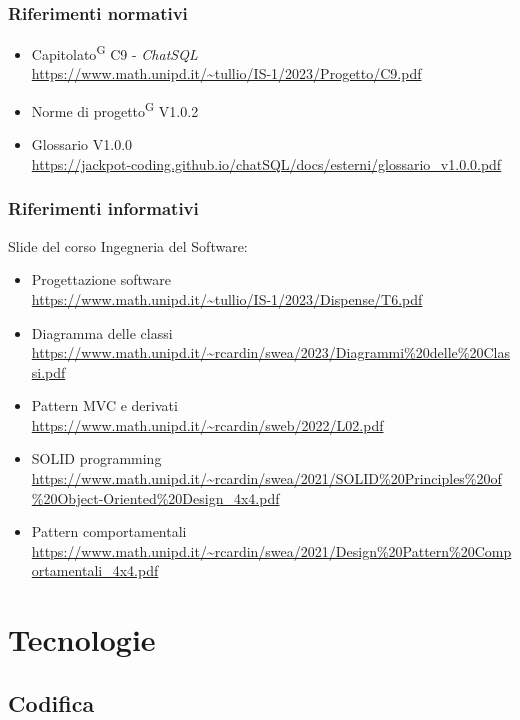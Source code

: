 \documentclass[5pt]{article}
\begin{document}
	\subsubsection{Riferimenti normativi}
	\begin{itemize}
		\item Capitolato\textsuperscript{G} C9 - \textit{ChatSQL} \\ \url{https://www.math.unipd.it/~tullio/IS-1/2023/Progetto/C9.pdf}
		\item Norme di progetto\textsuperscript{G} V1.0.2
		\item Glossario V1.0.0 \\
		\url{https://jackpot-coding.github.io/chatSQL/docs/esterni/glossario_v1.0.0.pdf}
	\end{itemize}
	\subsubsection{Riferimenti informativi}
	Slide del corso Ingegneria del Software:
	\begin{itemize}
		\item Progettazione software \\
		\url{https://www.math.unipd.it/~tullio/IS-1/2023/Dispense/T6.pdf}
		\item Diagramma delle classi \\
		\url{https://www.math.unipd.it/~rcardin/swea/2023/Diagrammi%20delle%20Classi.pdf}
		\item Pattern MVC e derivati \\
		\url{https://www.math.unipd.it/~rcardin/sweb/2022/L02.pdf}
		\item SOLID programming \\
		\url{https://www.math.unipd.it/~rcardin/swea/2021/SOLID%20Principles%20of%20Object-Oriented%20Design_4x4.pdf}
		\item Pattern comportamentali \\
		\url{https://www.math.unipd.it/~rcardin/swea/2021/Design%20Pattern%20Comportamentali_4x4.pdf}
	\end{itemize}
	
	\section{Tecnologie}
	
	\subsection{Codifica}
\end{document}
